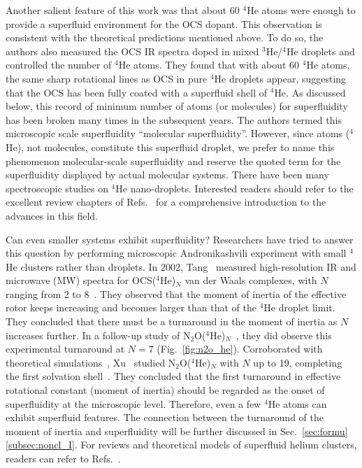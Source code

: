 \documentclass[12pt]{iopart}
\begin{document}
Another salient feature of this work was that about 60 $^4$He atoms were enough to provide a superfluid environment for the OCS dopant.
This observation is consistent with the theoretical predictions mentioned above. 
To do so, the authors also measured the OCS IR spectra doped in mixed  $^3$He/$^4$He  droplets and  controlled the number of $^4$He atoms. 
They found that with about 60 $^4$He atoms, the same sharp rotational lines as OCS in pure $^4$He droplets appear, suggesting that the OCS has been fully coated with a superfluid shell of $^4$He. 
As discussed below, this record of minimum number of atoms (or molecules) for superfluidity has been broken many times in the subsequent years. 
The authors termed this microscopic scale superfluidity  ``molecular superfluidity''. 
However, since atoms ($^4$He), not molecules, constitute this superfluid droplet, we prefer to name this phenomenon molecular-scale superfluidity and reserve the quoted term for the superfluidity displayed by actual molecular systems. 
There have been many spectroscopic studies on $^4$He nano-droplets. Interested readers should refer to the excellent review chapters of Refs.~\cite{vilesov_arrc, toennies_he_review,vilesov_acie,choi_he_review,stienkemeier_he_review,toennies_0.37K,callegari_nanocryostats,szalewicz_helium_review} for a comprehensive introduction to the advances in this field.

Can even smaller systems exhibit superfluidity? 
Researchers have tried to answer this question by performing microscopic Andronikashvili experiment with small $^4$He clusters rather than droplets. 
In 2002, Tang \etal~measured high-resolution IR and microwave (MW) spectra for OCS($^4$He)$_N$ van der Waals complexes, with $N$ ranging from 2 to 8~\cite{tang_OCS_He}. 
They observed that the moment of inertia of the effective rotor keeps increasing and becomes larger than that of the $^4$He droplet limit. 
They concluded that there must be a turnaround in the moment of inertia as $N$ increases further. 
In a follow-up study of N$_2$O($^4$He)$_N$~\cite{xu_turnaround_1}, they did observe this experimental turnaround at $N=7$ (Fig.~\ref{fig:n2o_he}). 
Corroborated with theoretical simulations~\cite{moroni_pn_pimc}, Xu \etal~studied N$_2$O($^4$He)$_N$ with $N$ up to 19, completing the first solvation shell~\cite{xu_turnaround_2}.
They concluded that the first turnaround in effective rotational constant (moment of inertia) should be regarded as the onset of superfluidity at the microscopic level. Therefore, even a few $^4$He atoms can exhibit superfluid features. 
The connection between the turnaround of the moment of inertia and superfluidity will be further discussed in Sec.~\ref{sec:formu}\ref{subsec:noncl_I}. 
For reviews and theoretical models of superfluid helium clusters, readers can refer to Refs.~\cite{barnett_review_he_cluster,toennies_helium_today,surin_review,paesani_he_review,he_overview,sf_model_ovchinnikov,novikov_diagram,alexey_gs_BEC,lehmann_model,kwon_superfluid_helium,yang_ellis_helium_droplet,surin_heco_2009}.
\end{document}
